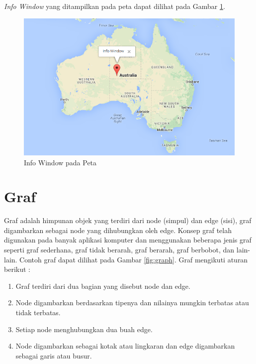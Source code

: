 \textit{Info Window} yang ditampilkan pada peta dapat dilihat pada Gambar
\ref{fig:infowindow}.
\begin{figure}[h]
\centering
\includegraphics[scale=0.6]{Gambar/infowindow}
\caption[Info Window pada Peta]{Info Window pada Peta}
\label{fig:infowindow}
\end{figure}


\section{Graf}
Graf adalah himpunan objek yang terdiri dari node (simpul) dan edge (sisi), graf 
digambarkan sebagai node yang dihubungkan oleh edge. Konsep graf telah digunakan pada 
banyak aplikasi komputer dan menggunakan beberapa jenis graf seperti graf sederhana, graf 
tidak berarah, graf berarah, graf berbobot, dan lain-lain. Contoh graf dapat
dilihat pada Gambar \ref{fig:graph}. Graf mengikuti aturan berikut
\footnotemark[2]:
\begin{enumerate}
\item Graf terdiri dari dua bagian yang disebut node dan edge.
\item Node digambarkan berdasarkan tipenya dan nilainya mungkin terbatas atau
tidak terbatas. 
\item Setiap node menghubungkan dua buah edge.
\item Node digambarkan sebagai kotak atau lingkaran dan edge digambarkan sebagai
garis atau busur.
\end{enumerate}

